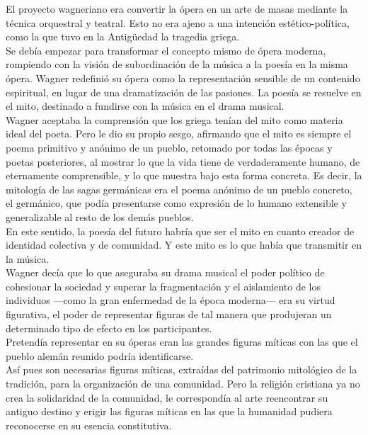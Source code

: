\documentclass[a4paper, 10pt, twocolumn, spanish]{article}
\begin{document}
El proyecto wagneriano era convertir la ópera en un arte de masas
mediante la técnica orquestral y teatral. Esto no era ajeno a una
intención estético-política, como la que tuvo en la Antigüedad la
tragedia griega.\\[0pt]

Se debía empezar para transformar el concepto mismo de ópera moderna,
rompiendo con la visión de subordinación de la música a la poesía en
la misma ópera. Wagner redefinió su ópera como la representación
sensible de un contenido espiritual, en lugar de una dramatización de
las pasiones. La poesía se resuelve en el mito, destinado a fundirse
con la música en el drama musical.\\[0pt]

Wagner aceptaba la comprensión que los griega tenían del mito como
materia ideal del poeta. Pero le dio su propio sesgo, afirmando que el
mito es siempre el poema primitivo y anónimo de un pueblo, retomado
por todas las épocas y poetas posteriores, al mostrar lo que la vida
tiene de verdaderamente humano, de eternamente comprensible, y lo que
muestra bajo esta forma concreta. Es decir, la mitología de las sagas
germánicas era el poema anónimo de un pueblo concreto, el germánico,
que podía presentarse como expresión de lo humano extensible y
generalizable al resto de los demás pueblos.\\[0pt]
En este sentido, la poesía del futuro habría que ser el mito en cuanto
creador de identidad colectiva y de comunidad. Y este mito es lo que
había que transmitir en la música.\\[0pt]

Wagner decía que lo que aseguraba su drama musical el poder político
de cohesionar la sociedad y superar la fragmentación y el aislamiento
de los individuos —como la gran enfermedad de la época moderna— era su
virtud figurativa, el poder de representar figuras de tal manera que
produjeran un determinado tipo de efecto en los participantes.\\[0pt]
Pretendía representar en su óperas eran las grandes figuras míticas
con las que el pueblo alemán reunido podría identificarse.\\[0pt]
Así pues son necesarias figuras míticas, extraídas del patrimonio
mitológico de la tradición, para la organización de una
comunidad. Pero la religión cristiana ya no crea la solidaridad de la
comunidad, le correspondía al arte reencontrar su antiguo destino y
erigir las figuras míticas en las que la humanidad pudiera reconocerse
en su esencia constitutiva.\\[0pt]
\end{document}
